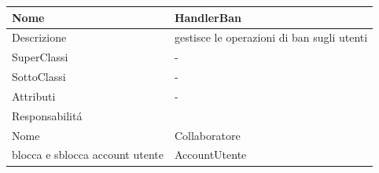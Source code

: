 \begin{center} %
    \begin{longtable}{ |p{3cm}|p{3cm}|p{3cm}|p{3cm}| }
        \hline
        Nome & \multicolumn{3}{|p{9cm}|}{HandlerBan} \\\hline
        Descrizione & \multicolumn{3}{|p{9cm}|}{gestisce le operazioni di ban sugli utenti} \\\hline
        SuperClassi & \multicolumn{3}{|p{9cm}|}{-} \\\hline
        SottoClassi & \multicolumn{3}{|p{9cm}|}{-} \\\hline
        Attributi & \multicolumn{3}{|p{9cm}|}{-} \\\hline
        \multicolumn{4}{|p{12cm}|}{Responsabilit\'a} \\\hline %
        \multicolumn{2}{|p{6cm}|}{Nome} & \multicolumn{2}{|p{6cm}|}{Collaboratore} \\\hline %
        \multicolumn{2}{|p{6cm}|}{blocca e sblocca account utente} & \multicolumn{2}{|p{6cm}|}{AccountUtente} \\\hline
    \end{longtable}
\end{center}



